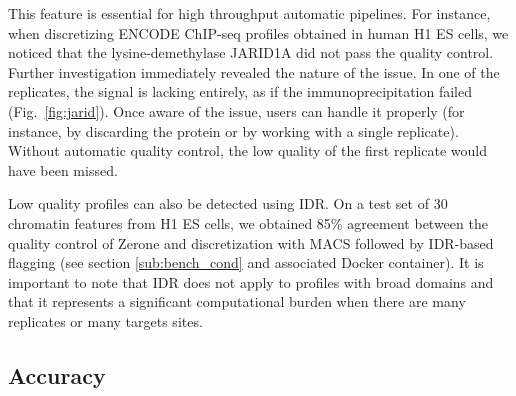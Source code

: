 \documentclass{bioinfo}
\begin{document}
This feature is essential for high throughput automatic pipelines.
For instance, when discretizing ENCODE ChIP-seq profiles obtained in
human H1 ES cells, we noticed that the lysine-demethylase JARID1A did
not pass the quality control.
Further investigation immediately revealed the nature of the issue.
In one of the replicates, the signal is lacking entirely, as if
the immunoprecipitation failed (Fig.~\ref{fig:jarid}).
Once aware of the issue, users can handle it properly (for instance,
by discarding the protein or by working with a single replicate).
Without automatic quality control, the low quality of the first replicate
would have been missed.

Low quality profiles can also be detected using IDR. On a test
set of 30 chromatin features from H1 ES cells, we obtained 85\%
agreement between the quality control of Zerone and discretization
with MACS followed by IDR-based flagging (see section
\ref{sub:bench_cond} and associated Docker
container). It is important to note that IDR does not apply to
profiles with broad domains and that it represents a significant
computational burden when there are many replicates or many targets
sites.

\subsection{Accuracy}
\end{document}
